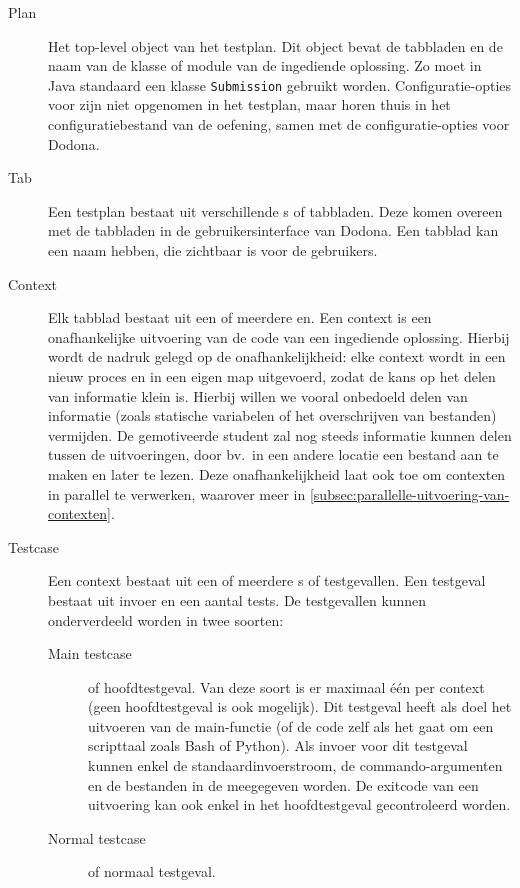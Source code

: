\begin{description}
    \item[Plan] Het top-level object van het testplan.
    Dit object bevat de tabbladen en de naam van de klasse of module van de ingediende oplossing.
    Zo moet in Java standaard een klasse \texttt{Submission} gebruikt worden.
    Configuratie-opties voor \tested{} zijn niet opgenomen in het testplan, maar horen thuis in het configuratiebestand van de oefening, samen met de configuratie-opties voor Dodona.
    \item[Tab] Een testplan bestaat uit verschillende s of tabbladen.
    Deze komen overeen met de tabbladen in de gebruikersinterface van Dodona.
    Een tabblad kan een naam hebben, die zichtbaar is voor de gebruikers.
    \item[Context] Elk tabblad bestaat uit een of meerdere en.
    Een context is een onafhankelijke uitvoering van de code van een ingediende oplossing.
    Hierbij wordt de nadruk gelegd op de onafhankelijkheid: elke context wordt in een nieuw proces en in een eigen map uitgevoerd, zodat de kans op het delen van informatie klein is.
    Hierbij willen we vooral onbedoeld delen van informatie (zoals statische variabelen of het overschrijven van bestanden) vermijden.
    De gemotiveerde student zal nog steeds informatie kunnen delen tussen de uitvoeringen, door bv.\ in een andere locatie een bestand aan te maken en later te lezen.
    Deze onafhankelijkheid laat ook toe om contexten in parallel te verwerken, waarover meer in \cref{subsec:parallelle-uitvoering-van-contexten}.
    \item[Testcase] Een context bestaat uit een of meerdere s of testgevallen.
    Een testgeval bestaat uit invoer en een aantal tests.
    De testgevallen kunnen onderverdeeld worden in twee soorten:
    \begin{description}
        \item[Main testcase] of hoofdtestgeval.
        Van deze soort is er maximaal één per context (geen hoofdtestgeval is ook mogelijk).
        Dit testgeval heeft als doel het uitvoeren van de main-functie (of de code zelf als het gaat om een scripttaal zoals Bash of Python).
        Als invoer voor dit testgeval kunnen enkel de standaardinvoerstroom, de commando-argumenten en de bestanden in de  meegegeven worden.
        De exitcode van een uitvoering kan ook enkel in het hoofdtestgeval gecontroleerd worden.
        \item[Normal testcase] of normaal testgeval.

\end{description}
\end{description}
